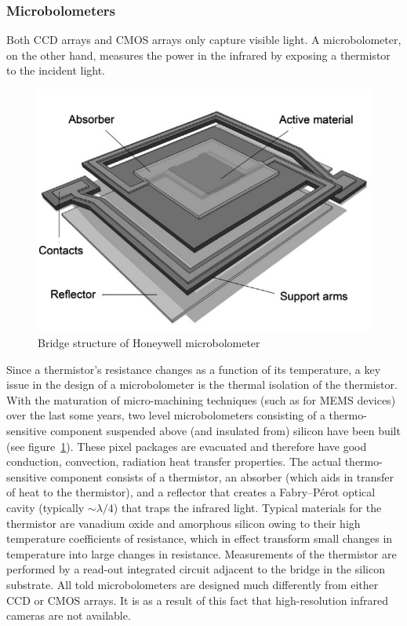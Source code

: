 \subsubsection{Microbolometers}
Both CCD arrays and CMOS arrays only capture visible light.
%
A microbolometer, on the other hand, measures the power in the infrared by exposing a thermistor to the incident light.
%
\begin{figure}[b]
    \center
    \includegraphics[width=.7\linewidth,keepaspectratio]{figures/microbolometer2.png}
    \caption{Bridge structure of Honeywell microbolometer\cite{KESIM2014245}}
    \label{fig:microbolometer}
\end{figure}
%
Since a thermistor's resistance changes as a function of its temperature, a key issue in the design of a microbolometer is the thermal isolation of the thermistor.
%
With the maturation of micro-machining techniques (such as for MEMS devices) over the last some years, two level microbolometers consisting of a thermo-sensitive component suspended above (and insulated from) silicon have been built (see figure~\ref{fig:microbolometer}).
%
These pixel packages are evacuated and therefore have good conduction, convection, radiation heat transfer properties.
%
The actual thermo-sensitive component consists of a thermistor, an absorber (which aids in transfer of heat to the thermistor), and a reflector that creates a Fabry–Pérot optical cavity (typically ${\sim}\lambda/4$\cite{bolometer}) that traps the infrared light.
%
Typical materials for the thermistor are vanadium oxide and amorphous silicon owing to their high temperature coefficients of resistance\cite{bolometer}, which in effect transform small changes in temperature into large changes in resistance.
%
Measurements of the thermistor are performed by a read-out integrated circuit adjacent to the bridge in the silicon substrate.
%
All told microbolometers are designed much differently from either CCD or CMOS arrays.
%
It is as a result of this fact that high-resolution infrared cameras are not available.

